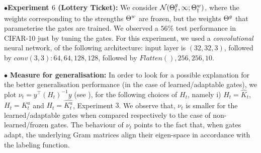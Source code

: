 $\bullet$\textbf{Experiment $6$ (Lottery Ticket):} We consider $\mathcal{N}({\Theta}^g_t,\infty;{\Theta}^w_{\dagger})$, where the weights corresponding to the strengths ${\Theta}^w$ are frozen, but the weights ${\Theta}^g$ that parameterise the gates are trained. We observed  a $56\%$ test performance in CIFAR-10 just by tuning the gates.  For this experiment, we used a \emph{convolutional} neural network, of the following architecture: input layer is $(32,32,3)$, followed by $conv(3, 3) : {64, 64, 128, 128}$, followed by $Flatten(), 256, 256, 10$.


$\bullet$ \textbf{Measure for generalisation:} In order to look for a possible explanation for the better generalisation performance (in the case of learned/adaptable gates), we plot $\nu_t=y^\top (H_t)^{-1}y$ (see ), for the following choices of $H_t$, namely  i) $H_t=\widehat{K}_t$,  $H_t=K^a_t$ and $H_t=\widehat{K^a_t}$,  Experiment $3$. We observe that, $\nu_t$ is smaller for the learned/adaptable gates when compared respectively to the case of non-learned/frozen gates. The behaviour of $\nu_t$ points to the fact that, when gates adapt, the underlying Gram matrices align their eigen-space in accordance with the labeling function.


